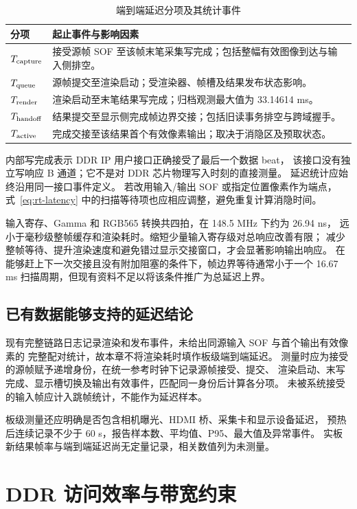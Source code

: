 \begin{table}[htbp]
\centering\small
\caption{端到端延迟分项及其统计事件}\label{tab:rt-latency}
\begin{tabularx}{\textwidth}{p{2.5cm}Y}
\toprule
分项 & 起止事件与影响因素 \\
\midrule
$T_{\rm capture}$ & 接受源帧 SOF 至该帧末笔采集写完成；包括整幅有效图像到达与输入侧排空。\\
$T_{\rm queue}$ & 源帧提交至渲染启动；受渲染器、帧槽及结果发布状态影响。\\
$T_{\rm render}$ & 渲染启动至末笔结果写完成；归档观测最大值为 33.14614 ms。\\
$T_{\rm handoff}$ & 结果提交至显示侧完成帧边界交接；包括旧读事务排空与跨域握手。\\
$T_{\rm active}$ & 完成交接至该结果首个有效像素输出；取决于消隐区及预取状态。\\
\bottomrule
\end{tabularx}
\end{table}

内部写完成表示 DDR IP 用户接口正确接受了最后一个数据 beat，
该接口没有独立写响应 B 通道；它不是对 DDR 芯片物理写入时刻的直接测量。
延迟统计应始终沿用同一接口事件定义。
若改用输入/输出 SOF 或指定位置像素作为端点，式~\eqref{eq:rt-latency}
中的扫描等待项也应相应调整，避免重复计算消隐时间。

输入寄存、Gamma 和 RGB565 转换共四拍，在 148.5 MHz 下约为 26.94 ns，
远小于毫秒级整帧缓存和渲染耗时。缩短少量输入寄存级对总响应改善有限；
减少整帧等待、提升渲染速度和避免错过显示交接窗口，才会显著影响输出响应。
在能够赶上下一次交接且没有附加阻塞的条件下，帧边界等待通常小于一个
16.67 ms 扫描周期，但现有资料不足以将该条件推广为总延迟上界。

\subsection{已有数据能够支持的延迟结论}
现有完整链路日志记录渲染和发布事件，未给出同源输入 SOF 与首个输出有效像素的
完整配对统计，故本章不将渲染耗时填作板级端到端延迟。
测量时应为接受的源帧赋予递增身份，在统一参考时钟下记录源帧接受、提交、
渲染启动、末写完成、显示槽切换及输出有效事件，匹配同一身份后计算各分项。
未被系统接受的输入帧应计入跳帧统计，不能作为延迟样本。

板级测量还应明确是否包含相机曝光、HDMI 桥、采集卡和显示设备延迟，
预热后连续记录不少于 60 s，报告样本数、平均值、P95、最大值及异常事件。
实板新结果帧率与端到端延迟尚无定量记录，相关数值列为未测量。

\section{DDR 访问效率与带宽约束}
